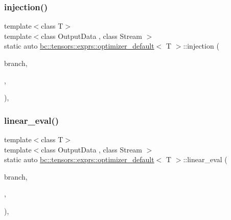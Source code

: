 \mbox{\label{structbc_1_1tensors_1_1exprs_1_1optimizer__default_a9669bd5127ec6b48422735ce8e881005}} 
\subsubsection{\texorpdfstring{injection()}{injection()}}
{\footnotesize\ttfamily template$<$class T$>$ \\
template$<$class Output\+Data , class Stream $>$ \\
static auto \hyperlink{structbc_1_1tensors_1_1exprs_1_1optimizer__default}{bc\+::tensors\+::exprs\+::optimizer\+\_\+default}$<$ T $>$\+::injection (\begin{DoxyParamCaption}\item[{T}]{branch,  }\item[{Output\+Data}]{,  }\item[{\hyperlink{classbc_1_1streams_1_1Stream}{Stream}}]{ }\end{DoxyParamCaption})\hspace{0.3cm}{\ttfamily [inline]}, {\ttfamily [static]}}

\mbox{\label{structbc_1_1tensors_1_1exprs_1_1optimizer__default_a31880c96689c4d99ddd9fdddb0be1303}} 
\subsubsection{\texorpdfstring{linear\+\_\+eval()}{linear\_eval()}}
{\footnotesize\ttfamily template$<$class T$>$ \\
template$<$class Output\+Data , class Stream $>$ \\
static auto \hyperlink{structbc_1_1tensors_1_1exprs_1_1optimizer__default}{bc\+::tensors\+::exprs\+::optimizer\+\_\+default}$<$ T $>$\+::linear\+\_\+eval (\begin{DoxyParamCaption}\item[{T}]{branch,  }\item[{Output\+Data}]{,  }\item[{\hyperlink{classbc_1_1streams_1_1Stream}{Stream}}]{ }\end{DoxyParamCaption})\hspace{0.3cm}{\ttfamily [inline]}, {\ttfamily [static]}}

